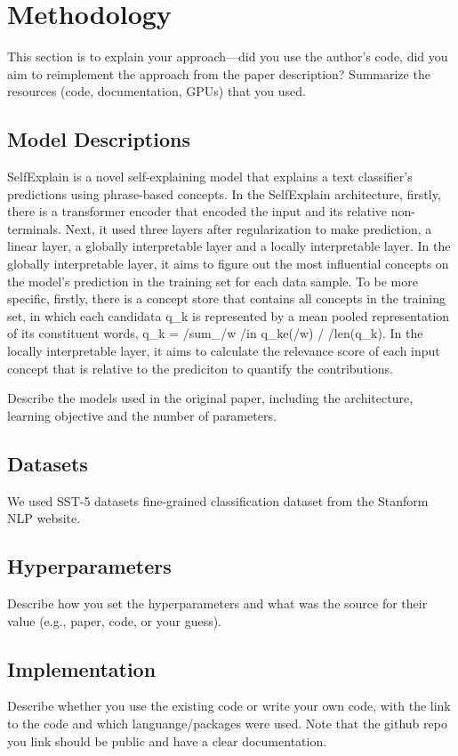 \documentclass{article}
\begin{document}
\section{Methodology}

This section is to explain your approach---did you use the author's code, did you aim to reimplement the approach from the paper description? Summarize the resources (code, documentation, GPUs) that you used. 

\subsection{Model Descriptions}

SelfExplain is a novel self-explaining model that explains a text classifier's predictions using phrase-based concepts. In the SelfExplain architecture, firstly, there is a transformer encoder that encoded the input and its relative non-terminals. Next, it used three layers after regularization to make prediction, a linear layer, a globally interpretable layer and a locally interpretable layer. In the globally interpretable layer, it aims to figure out the most influential concepts on the model's prediction in the training set for each data sample. To be more specific, firstly, there is a concept store that contains all concepts in the training set, in which each candidata q_k is represented by a mean pooled representation of its constituent words, q_k = /sum_{/w /in q_k}{e(/w)} / /len(q_k). In the locally interpretable layer, it aims to calculate the relevance score of each input concept that is relative to the prediciton to quantify the contributions. 

Describe the models used in the original paper, including the architecture, learning objective and the number of parameters.

\subsection{Datasets}
We used SST-5 datasets fine-grained classification dataset from the Stanform NLP website.

\subsection{Hyperparameters}
Describe how you set the hyperparameters and what was the source for their value (e.g., paper, code, or your guess). 

\subsection{Implementation}
Describe whether you use the existing code or write your own code, with the link to the code and which languange/packages were used. Note that the github repo you link should be public and have a clear documentation.
\end{document}
